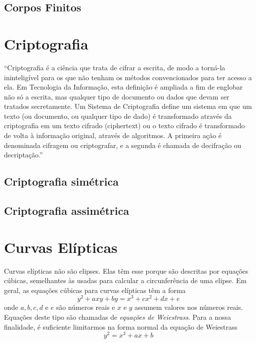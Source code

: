 %
%
\subsection{Corpos Finitos}

%
%
\section{Criptografia} \label{sec:criptografia}
``Criptografia é a ciência que trata de cifrar a escrita, de modo a torná-la ininteligível para os que não tenham os métodos convencionados para ter acesso a ela. Em Tecnologia da Informação, esta definição é ampliada a fim de englobar não só a escrita, mas qualquer tipo de documento ou dados que devam ser tratados secretamente. Um Sistema de Criptografia define um sistema em que um texto (ou documento, ou qualquer tipo de dado) é transformado através da criptografia em um texto cifrado (ciphertext) ou o texto cifrado é transformado de volta à informação original, através de algoritmos. A primeira ação é denominada cifragem ou criptografar, e a segunda é chamada de decifração ou decriptação.'' \cite{Portnoi:2005}

%
%
\subsection{Criptografia simétrica}

%
%
\subsection{Criptografia assimétrica}

%
%
\section{Curvas Elípticas}
Curvas elípticas não são elipses. Elas têm esse porque são descritas por equações cúbicas, semelhantes às usadas para calcular a circunferência de uma elipse. Em geral, as equações cúbicas para curvas elípticas têm a forma
\begin{equation}
y^2 + axy + by = x^3 + cx^2 + dx + e \label{eq:11}
\end{equation}
onde \(a, b, c, d\) e \(e\) são números reais e \(x\) e \(y\) assumem valores nos números reais. Equações deste tipo são chamadas de \textit{equações de Weiestrass}. Para a nossa finalidade, é suficiente limitarmos na forma normal da equação de Weiestrass
\begin{equation}
y^2 = x^3 + ax + b \label{eq:12}
\end{equation}

